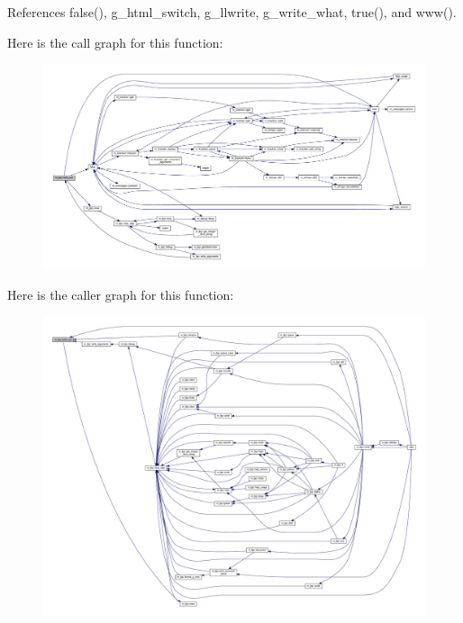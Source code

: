References false(), g\+\_\+html\+\_\+switch, g\+\_\+llwrite, g\+\_\+write\+\_\+what, true(), and www().

Here is the call graph for this function\+:
\nopagebreak
\begin{figure}[H]
\begin{center}
\leavevmode
\includegraphics[width=350pt]{namespacem__fpp_a945cf0930719327ca5ee9a866c11dc7a_cgraph}
\end{center}
\end{figure}
Here is the caller graph for this function\+:
\nopagebreak
\begin{figure}[H]
\begin{center}
\leavevmode
\includegraphics[width=350pt]{namespacem__fpp_a945cf0930719327ca5ee9a866c11dc7a_icgraph}
\end{center}
\end{figure}
\mbox{\label{namespacem__fpp_ac474947a9f75959822fccd4d82a05258}} 
